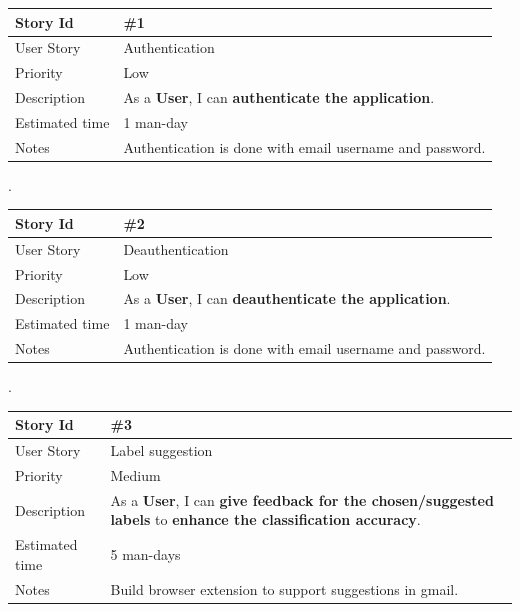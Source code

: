 \begin{tabular}{|p{3cm}|p{10cm}|}
\hline
\cellcolor[gray]{0.9} Story Id & \#1 \\ \hline
\cellcolor[gray]{0.9} User Story & Authentication \\ \hline
\cellcolor[gray]{0.9} Priority & Low \\ \hline
\cellcolor[gray]{0.9} Description & 
      As a \textbf{User}, I can \textbf{authenticate the application}. \\ \hline
\cellcolor[gray]{0.9} Estimated time & 1 man-day \\ \hline
\cellcolor[gray]{0.9} Notes & 
      Authentication is done with email username and password. \\ \hline
\end{tabular}

.\\

\begin{tabular}{|p{3cm}|p{10cm}|}
\hline
\cellcolor[gray]{0.9} Story Id & \#2 \\ \hline
\cellcolor[gray]{0.9} User Story & Deauthentication \\ \hline
\cellcolor[gray]{0.9} Priority & Low \\ \hline
\cellcolor[gray]{0.9} Description & 
	As a \textbf{User}, I can \textbf{deauthenticate the application}. \\ \hline
\cellcolor[gray]{0.9} Estimated time & 1 man-day \\ \hline
\cellcolor[gray]{0.9} Notes & 
	Authentication is done with email username and password. \\ \hline
\end{tabular}


.\\

\begin{tabular}{|p{3cm}|p{10cm}|}
\hline
\cellcolor[gray]{0.9} Story Id & \#3 \\ \hline
\cellcolor[gray]{0.9} User Story & Label suggestion \\ \hline
\cellcolor[gray]{0.9} Priority & Medium\\ \hline
\cellcolor[gray]{0.9} Description & 
	As a \textbf{User}, I can \textbf{give feedback for the chosen/suggested labels} to
	\textbf{enhance the classification accuracy}. \\ \hline
\cellcolor[gray]{0.9} Estimated time & 5 man-days\\ \hline
\cellcolor[gray]{0.9} Notes & 
	Build browser extension to support suggestions in gmail. \\ \hline
\end{tabular}

